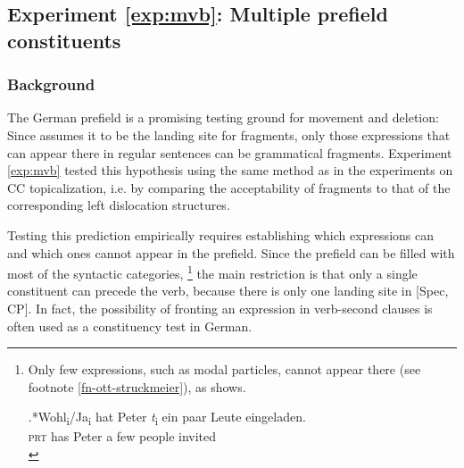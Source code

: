 \label{exp:mvb}
\subsection{Experiment \ref{exp:mvb}: Multiple prefield constituents}
\subsubsection{Background}\label{sec:mvb-background}
The German prefield is a promising testing ground for movement and deletion: Since \citet{merchant2004} assumes it to be the landing site for fragments, only those expressions that can appear there in regular sentences can be grammatical fragments. Experiment \ref{exp:mvb} tested this hypothesis using the same method as in the experiments on CC topicalization, i.e. by comparing the acceptability of fragments to that of the corresponding left dislocation structures.

Testing this prediction empirically requires establishing which expressions can and which ones cannot appear in the prefield. Since the prefield can be filled with most of the syntactic categories,%
%
\footnote{Only few expressions, such as modal particles, cannot appear there (see footnote \ref{fn-ott-struckmeier}), as \Next shows.

\exg.*Wohl\textsubscript{i}/Ja\textsubscript{i} hat Peter \textit{t}\textsubscript{i} ein paar Leute eingeladen.\\
\textsc{prt} has Peter \mbox{} a few people invited\\

}\afterfn%
%
the main restriction is that only a single constituent can precede the verb, because there is only one landing site in [Spec, CP]. In fact, the possibility of fronting an expression in verb-second clauses is often used as a constituency test in German. 


